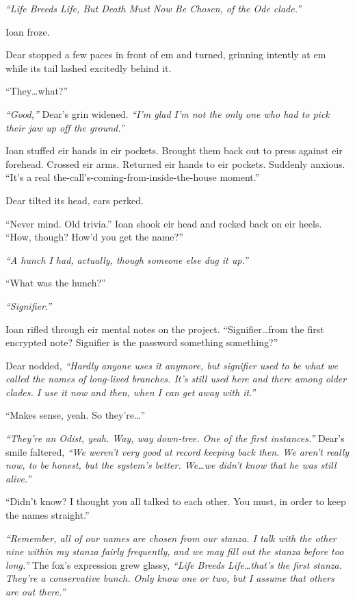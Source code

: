 \emph{``Life Breeds Life, But Death Must Now Be Chosen, of the Ode clade.''}

Ioan froze.

Dear stopped a few paces in front of em and turned, grinning intently at em while its tail lashed excitedly behind it.

``They\ldots{}what?''

\emph{``Good,''} Dear's grin widened. \emph{``I'm glad I'm not the only one who had to pick their jaw up off the ground.''}

Ioan stuffed eir hands in eir pockets. Brought them back out to press against eir forehead. Crossed eir arms. Returned eir hands to eir pockets. Suddenly anxious. ``It's a real the-call's-coming-from-inside-the-house moment.''

Dear tilted its head, ears perked.

``Never mind. Old trivia.'' Ioan shook eir head and rocked back on eir heels. ``How, though? How'd you get the name?''

\emph{``A hunch I had, actually, though someone else dug it up.''}

``What was the hunch?''

\emph{``Signifier.''}

Ioan rifled through eir mental notes on the project. ``Signifier\ldots{}from the first encrypted note? Signifier is the password something something?''

Dear nodded, \emph{``Hardly anyone uses it anymore, but signifier used to be what we called the names of long-lived branches. It's still used here and there among older clades. I use it now and then, when I can get away with it.''}

``Makes sense, yeah. So they're\ldots{}''

\emph{``They're an Odist, yeah. Way, way down-tree. One of the first instances.''} Dear's smile faltered, \emph{``We weren't very good at record keeping back then. We aren't really now, to be honest, but the system's better. We\ldots{}we didn't know that he was still alive.''}

``Didn't know? I thought you all talked to each other. You must, in order to keep the names straight.''

\emph{``Remember, all of our names are chosen from our stanza. I talk with the other nine within my stanza fairly frequently, and we may fill out the stanza before too long.''} The fox's expression grew glassy, \emph{``Life Breeds Life\ldots{}that's the first stanza. They're a conservative bunch. Only know one or two, but I assume that others are out there.''}

